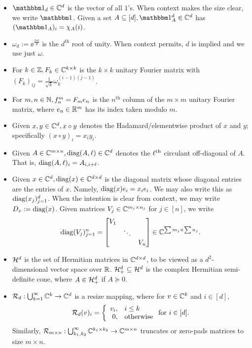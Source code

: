 \begin{itemize}
  \item $\one_d \in \C^d$ is the vector of all $1$'s.  When context makes the size clear, we write $\one$.  Given a set $A \subset [d], \one_A^d \in \C^d$ has $(\one_A)_i = \chi_A(i)$.
\item $\omega_d := \ee^{\frac{2 \pi \ii}{d}}$ is the $d^{\text{th}}$ root of unity.  When context permits, $d$ is implied and we use just $\omega$.
\item For $k \in \mathbb{Z}, F_k \in \mathbb{C}^{k \times k}$ is the $k \times k$ unitary Fourier matrix with $(F_k)_{ij} = \frac{1}{\sqrt{k}} \omega_k^{(i-1)(j-1)}$.
  \item For $m, n \in \mathbb{N}, f_n^m = F_m e_n$ is the $n^{\text{th}}$ column of the $m \times m$ unitary Fourier matrix, where $e_n \in \mathbb{R}^m$ has its index taken modulo $m$.
\item Given $x, y \in \mathbb{C}^d, x \circ y$ denotes the Hadamard/elementwise product of $x$ and $y$; specifically $(x \circ y)_i = x_i y_i$.
\item Given $A \in \mathbb{C}^{m \times n}, \operatorname{diag}(A, \ell) \in \mathbb{C}^d$ denotes the $\ell^{\text{th}}$ circulant off-diagonal of $A$.  That is, $\operatorname{diag}(A, \ell)_i = A_{i, i + \ell}$.
\item {}Given $x \in \mathbb{C}^d, \operatorname{diag}(x) \in \mathbb{C}^{d \times d}$ is the diagonal matrix whose diagonal entries are the entries of $x$.  Namely, $\operatorname{diag}(x) e_i = x_i e_i$.  We may also write this as $\operatorname{diag}(x_j)_{j = 1}^d$.  When the intention is clear from context, we may write $D_x := \operatorname{diag}(x)$.  Given matrices $V_j \in \mathbb{C}^{m_j \times n_j}$ for $j \in [n]$, we write \[\operatorname{diag}(V_j)_{j = 1}^n = \begin{bmatrix} V_1 & & \\ & \ddots & \\ & & V_n \end{bmatrix} \in \mathbb{C}^{\sum m_j \times \sum n_j}.\]
  \item $\mathcal{H}^d$ is the set of Hermitian matrices in $\mathbb{C}^{d \times d}$, to be viewed as a $d^2$-dimensional vector space over $\mathbb{R}$.  $\mathcal{H}^d_+ \subseteq \mathcal{H}^d$ is the complex Hermitian semi-definite cone, where $A \in \mathcal{H}^d_+$ if $A \succeq 0$.
  \item {}$\mathcal{R}_d : \bigcup_{k = 1}^\infty \mathbb{C}^k \to \mathbb{C}^d$ is a resize mapping, where for $v \in \mathbb{C}^k$ and $i \in [d],$ $$\mathcal{R}_d(v)_i = \left\{\begin{array}{r@{,\quad}l} v_i & i \le k \\ 0 & \text{otherwise} \end{array}\right. \text{for}\ i \in [d].$$  Similarly, $\mathcal{R}_{m \times n} : \bigcup_{k_1, k_2}^\infty \mathbb{C}^{k_1 \times k_2} \to \mathbb{C}^{m \times n}$ truncates or zero-pads matrices to size $m \times n.$

\end{itemize}

